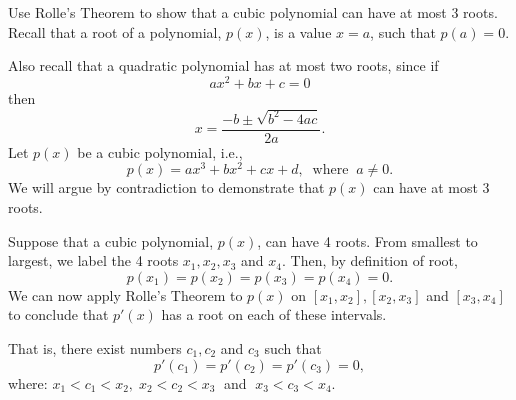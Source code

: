 \documentclass[handout]{ximera}
\begin{document}
\begin{example} Use Rolle's Theorem  to show that a cubic polynomial can have at most 3 roots.\\
Recall that a root of a polynomial, $p(x)$, is a value $x = a$, such that $p(a) = 0$.

Also recall that a quadratic polynomial has at most two roots, since if
\[
ax^2 + bx + c = 0
\]
then
\[
x = \frac{-b \pm \sqrt{b^2 - 4ac}}{2a}.
\]
Let $p(x)$ be a cubic polynomial, i.e., 
\[
p(x) = ax^3 + bx^2 + cx + d, \;\; \text{where} \;\; a\neq 0.
\]
We will argue by contradiction to demonstrate that $p(x)$ can have at most 3 roots.

Suppose that a cubic polynomial, $p(x)$, can have 4 roots.  From smallest to largest, we label the 4 roots $x_1, x_2, x_3$ and $x_4$.
Then, by definition of root,
\[
p(x_1) = p(x_2) = p(x_3) = p(x_4) = 0.
\]
We can now apply Rolle's Theorem to $p(x)$ on $[x_1, x_2], [x_2, x_3]$ and $[x_3, x_4]$ to conclude
that $p'(x)$ has a root on each of these intervals. 

That is, there exist numbers $c_1, c_2$ and $c_3$ such that
\[
p'(c_1) = p'(c_2) = p'(c_3) = 0,
\]
where: $x_1 < c_1 < x_2, \; x_2 < c_2 < x_3 \;$ and $\; x_3 < c_3 < x_4$.

\begin{image}
\end{image}


\end{example}
\end{document}
